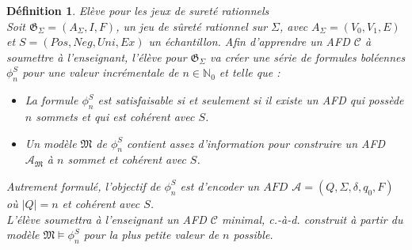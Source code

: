 \documentclass[12pt,a4paper,oneside,titlepage]{report}
\newtheorem{defi}{D\'efinition}[section]
\begin{document}
\begin{defi}{Elève pour les jeux de sureté rationnels\\}
\label{learner}
Soit $\mathfrak{G}_\Sigma=(A_\Sigma, I, F)$, un jeu de sûreté rationnel sur $\Sigma$, avec $A_\Sigma=(V_0,V_1,E)$ et $S=(Pos,Neg,Uni,Ex)$ un échantillon. Afin d'apprendre un AFD $\mathcal{C}$ à soumettre à l'enseignant, l'élève pour $\mathfrak{G}_\Sigma$ va créer une série de formules boléennes $\phi^S_n$ pour une valeur incrémentale de $n\in\mathbb{N}_0$ et telle que :
\begin{itemize}
\item La formule $\phi^S_n$ est satisfaisable si et seulement si il existe un AFD qui possède $n$ sommets et qui est cohérent avec $S$.
\item Un modèle $\mathfrak{M}$ de $\phi^S_n$ contient assez d'information pour construire un AFD $\mathcal{A}_\mathfrak{M}$ à $n$ sommet et cohérent avec $S$.
\end{itemize}
\noindent Autrement formulé, l'objectif de $\phi^S_n$ est d'encoder un $AFD$ $\mathcal{A}=(Q,\Sigma,\delta,q_0,F)$ où $|Q|=n$ et cohérent avec $S$.\\
L'élève soumettra à l'enseignant un AFD $\mathcal{C}$ minimal, c.-à-d. construit à partir du modèle $\mathfrak{M}\models \phi_n^S$ pour la plus petite valeur de $n$ possible.
\end{defi}
\end{document}
